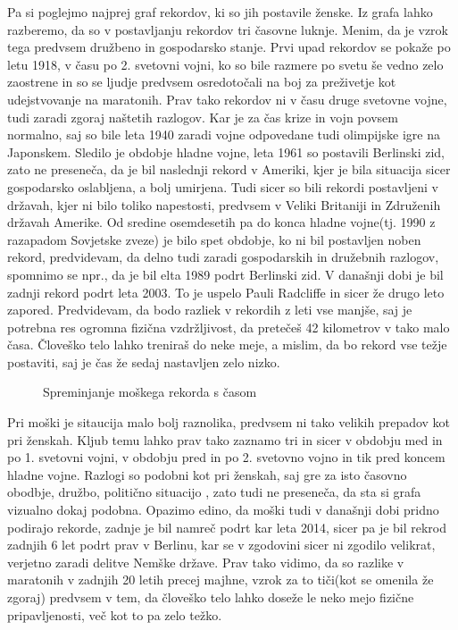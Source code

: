 \documentclass[11pt,a4paper]{article}
\begin{document}
Pa si poglejmo najprej graf rekordov, ki so jih postavile ženske.
Iz grafa lahko razberemo, da so v postavljanju rekordov tri časovne luknje. Menim, da je vzrok tega predvsem družbeno in gospodarsko stanje. Prvi upad rekordov se pokaže po letu 1918, v času po 2. svetovni vojni, ko so bile razmere po svetu še vedno zelo zaostrene in so se ljudje predvsem osredotočali na boj za preživetje kot udejstvovanje na maratonih.
Prav tako rekordov ni v času druge svetovne vojne, tudi zaradi zgoraj naštetih razlogov. Kar je za čas krize in vojn povsem normalno, saj so bile leta 1940 zaradi vojne odpovedane tudi olimpijske igre na Japonskem.
Sledilo je obdobje hladne vojne, leta 1961 so postavili Berlinski zid, zato ne preseneča, da je bil naslednji rekord v Ameriki, kjer je bila situacija sicer gospodarsko oslabljena, a bolj umirjena. Tudi sicer so bili rekordi postavljeni v državah, kjer ni bilo toliko napestosti, predvsem v Veliki Britaniji in Združenih državah Amerike.
Od sredine osemdesetih pa do konca hladne vojne(tj. 1990 z razapadom Sovjetske zveze) je bilo spet obdobje, ko ni bil postavljen noben rekord, predvidevam, da delno tudi zaradi gospodarskih in družebnih razlogov, spomnimo se npr., da je bil elta 1989 podrt Berlinski zid.
V današnji dobi je bil zadnji rekord podrt leta 2003. To je uspelo Pauli Radcliffe in sicer že drugo leto zapored.
Predvidevam, da bodo razliek v rekordih z leti vse manjše, saj je potrebna res ogromna fizična vzdržljivost, da  pretečeš 42 kilometrov v tako malo časa. Človeško telo lahko treniraš do neke meje, a mislim, da bo rekord vse težje postaviti, saj je čas že sedaj nastavljen zelo nizko.

\begin{figure}[H]
  \caption{Spreminjanje moškega rekorda s časom}
  \label{fig:Slika 4}
\end{figure}

Pri moški je sitaucija malo bolj raznolika, predvsem ni tako velikih prepadov kot pri ženskah. Kljub temu lahko prav tako zaznamo tri in sicer v obdobju med in po 1. svetovni vojni, v obdobju pred in po 2. svetovno vojno in tik pred koncem hladne vojne. Razlogi so podobni kot pri ženskah, saj gre za isto časovno obodbje, družbo, politično situacijo , zato tudi ne preseneča, da sta si grafa vizualno dokaj podobna. Opazimo edino, da moški tudi v današnji dobi pridno podirajo rekorde, zadnje je bil namreč podrt kar leta 2014, sicer pa je bil rekrod zadnjih 6 let podrt prav v Berlinu, kar se v zgodovini sicer ni zgodilo velikrat, verjetno zaradi delitve Nemške države.
Prav tako vidimo, da so razlike v maratonih v zadnjih 20 letih precej majhne, vzrok za to tiči(kot se omenila že zgoraj) predvsem v tem, da človeško telo lahko doseže le neko mejo fizične pripavljenosti, več kot to pa zelo težko.
\end{document}
